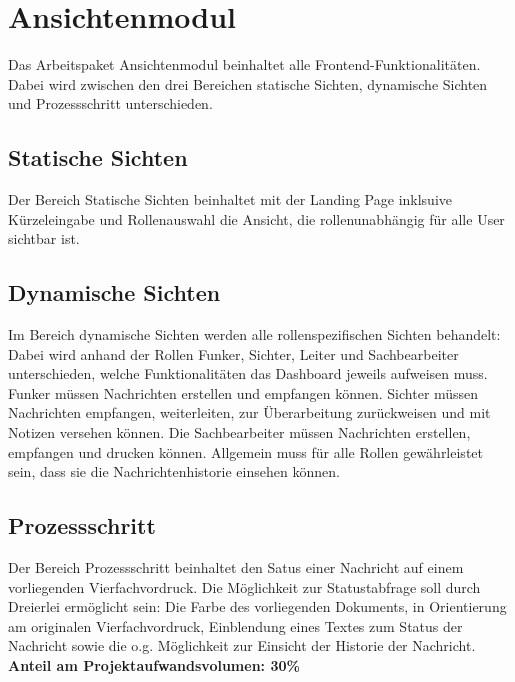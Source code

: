 \section{Ansichtenmodul} 
Das Arbeitspaket Ansichtenmodul beinhaltet alle Frontend-Funktionalitäten. 
Dabei wird zwischen den drei Bereichen statische Sichten, dynamische Sichten 
und Prozessschritt unterschieden. 
\subsection{Statische Sichten}
Der Bereich Statische Sichten beinhaltet mit der Landing Page inklsuive 
Kürzeleingabe und Rollenauswahl die Ansicht, die rollenunabhängig für 
alle User sichtbar ist. 
\subsection{Dynamische Sichten}
Im Bereich dynamische Sichten werden alle rollenspezifischen Sichten 
behandelt: Dabei wird anhand der Rollen Funker, Sichter, Leiter und 
Sachbearbeiter unterschieden, welche Funktionalitäten das Dashboard jeweils 
aufweisen muss. Funker müssen Nachrichten erstellen und empfangen können.
Sichter müssen Nachrichten empfangen, weiterleiten, zur Überarbeitung 
zurückweisen und mit Notizen versehen können. Die Sachbearbeiter müssen 
Nachrichten erstellen, empfangen und drucken können. 
Allgemein muss für alle Rollen gewährleistet sein, dass sie die 
Nachrichtenhistorie einsehen können. 
\subsection{Prozessschritt}
Der Bereich Prozessschritt beinhaltet den Satus einer Nachricht 
auf einem vorliegenden Vierfachvordruck. Die Möglichkeit zur Statustabfrage 
soll durch Dreierlei ermöglicht sein: Die Farbe des vorliegenden Dokuments, 
in Orientierung am originalen Vierfachvordruck, Einblendung eines 
Textes zum Status der Nachricht sowie die o.g. Möglichkeit zur Einsicht der 
Historie der Nachricht.
\textbf{Anteil am Projektaufwandsvolumen: 30\%}